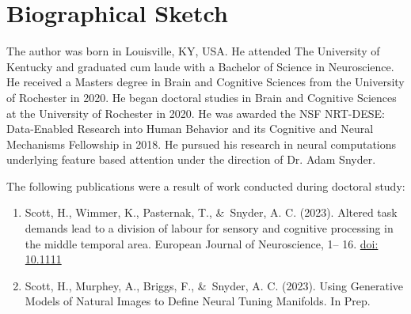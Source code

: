 



\chapter{\color{thesisBlue} Biographical Sketch}

The author was born in Louisville, KY, USA. He attended The University of Kentucky and graduated cum laude with a Bachelor of Science in Neuroscience. He received a Masters degree in Brain and Cognitive Sciences from the University of Rochester in 2020. He began doctoral studies in Brain and Cognitive Sciences at the University of Rochester in 2020. He was awarded the NSF NRT-DESE: Data-Enabled Research into Human Behavior and its Cognitive and Neural
Mechanisms Fellowship in 2018. He pursued his research in neural computations underlying feature based attention under the direction of Dr. Adam Snyder.

The following publications were a result of work conducted during doctoral study:

\begin{enumerate}
	\item Scott, H., Wimmer, K., Pasternak, T., \&\ Snyder, A. C. (2023). Altered task demands lead to a division of labour for sensory and cognitive processing in the middle temporal area. European Journal of Neuroscience, 1– 16. \href{https://doi.org/10.1111/ejn.15964}{doi: 10.1111}
	\item Scott, H., Murphey, A., Briggs, F., \&\ Snyder, A. C. (2023). Using Generative Models of Natural Images to Define Neural Tuning Manifolds. In Prep.
\end{enumerate}



